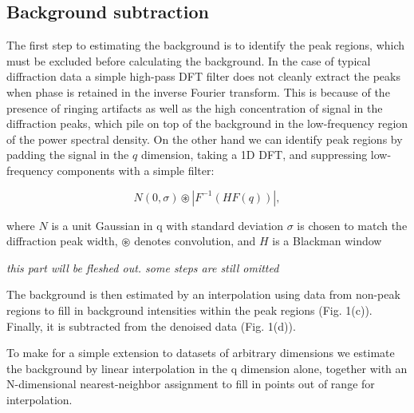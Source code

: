 \documentclass[12pt]{iopart}
\begin{document}
\subsection{Background subtraction}
The first step to estimating the background is to identify the peak
regions, which must be excluded before calculating the background. In
the case of typical diffraction data a simple high-pass DFT filter does
not cleanly extract the peaks when phase is retained in the inverse
Fourier transform. This is because of the presence of ringing artifacts
as well as the high concentration of signal in the diffraction peaks,
which pile on top of the background in the low-frequency region of the
power spectral density. On the other hand we can identify peak regions
by padding the signal in the $q$ dimension, taking a 1D DFT, and
suppressing low-frequency components with a simple filter:

\begin{equation}
N(0, \sigma) \circledast |{F}^{-1}(H  {F}(q))|,
\end{equation}

where $N$ is a unit Gaussian in q with standard deviation $\sigma$
is chosen to match the diffraction peak width, $\circledast$ denotes
convolution, and $H$ is a Blackman window 

\emph{this part will be fleshed out. some steps are still omitted}

The background is then estimated by an interpolation using data from non-peak regions to
fill in background intensities within the peak regions (Fig. 1(c)).
Finally, it is subtracted from the denoised data (Fig. 1(d)).

To make for a simple extension to datasets of arbitrary dimensions we
estimate the background by linear interpolation in the q dimension
alone, together with an N-dimensional nearest-neighbor assignment to
fill in points out of range for interpolation.
\end{document}
